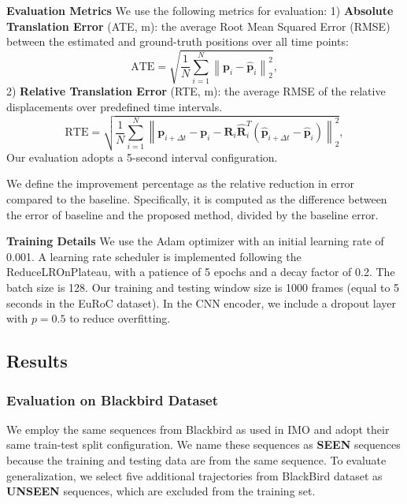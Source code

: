 \noindent\textbf{Evaluation Metrics} We use the following metrics for evaluation: 1) \textbf{Absolute Translation Error} (ATE, $\si{\meter}$): the average Root Mean Squared Error (RMSE) between the estimated and ground-truth positions over all time points:
\begin{equation}
    \text{ATE} =\sqrt{\frac{1}{N}\sum^N_{i=1}{\left\| \mathbf{p}_{i} - \hat{\mathbf{p}}_{i}\right\|_2^2}},
\end{equation}
2) \textbf{Relative Translation Error} (RTE, $\si{\meter}$): the average RMSE of the relative displacements over predefined time intervals.
\begin{equation}
    \text{RTE} = \sqrt{ \frac{1}{N}\sum^N_{i=1}\left\| \mathbf{p}_{i+\Delta t} - \mathbf{p}_{i} - \mathbf{R}_{i}\hat{\mathbf{R}}_{i}^T \left(\hat{\mathbf{p}}_{i+\Delta t} - \hat{\mathbf{p}}_{i}\right)\right\|^2_2},
\end{equation}
Our evaluation adopts a 5-second interval configuration.

We define the improvement percentage as the relative reduction in error compared to the baseline. Specifically, it is computed as the difference between the error of baseline and the proposed method, divided by the baseline error.

\noindent\textbf{Training Details} We use the Adam optimizer with an initial learning rate of 0.001. A learning rate scheduler is implemented following the ReduceLROnPlateau, with a patience of 5 epochs and a decay factor of 0.2. The batch size is 128. Our training and testing window size is 1000 frames (equal to 5 seconds in the EuRoC dataset). In the CNN encoder, we include a dropout layer with $p=0.5$ to reduce overfitting.

\subsection{Results}
\subsubsection{Evaluation on Blackbird Dataset}
We employ the same sequences from Blackbird as used in IMO \cite{CioffiRal2023} and adopt their same train-test split configuration. We name these sequences as \textbf{SEEN} sequences because the training and testing data are from the same sequence. To evaluate generalization, we select five additional trajectories from BlackBird dataset as \textbf{UNSEEN} sequences, which are excluded from the training set.


